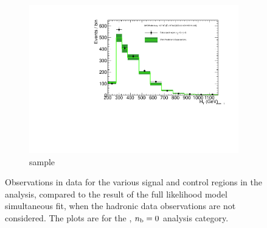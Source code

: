 \begin{figure}[h!]
\begin{subfigure}[b]{0.48\textwidth}
    \includegraphics[width=\textwidth,page=6]
    {Figs/results/v0/greenBand/bestFit_2012dev_RQcdZero_fZinvAll_0b_ge4j-12p_smOnly}
    \caption{\gj sample}
  \end{subfigure}
  \caption{Observations in data for the various signal and control
  regions in the analysis, compared to the result of the full likelihood model
  simultaneous fit, when the hadronic data observations are not considered. The
  plots are for the \njhigh, $n_{\text{b}} = 0$ analysis category.}
  \label{fig:green_fits_0b_ge4j}
\end{figure}

